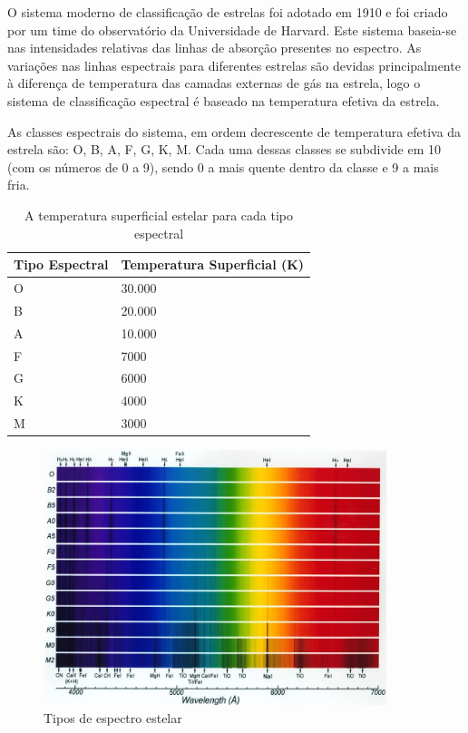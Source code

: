 O sistema moderno de classificação de estrelas foi adotado em 1910 e foi criado por um time do observatório da Universidade de Harvard. Este sistema baseia-se nas intensidades relativas das linhas de absorção presentes no espectro. As variações nas linhas espectrais para diferentes estrelas são devidas principalmente à diferença de temperatura das camadas externas de gás na estrela, logo o sistema de classificação espectral é baseado na temperatura efetiva da estrela. 

As classes espectrais do sistema, em ordem decrescente de temperatura efetiva da estrela são: O, B, A, F, G, K, M. Cada uma dessas classes se subdivide em 10 (com os números de 0 a 9), sendo 0 a mais quente dentro da classe e 9 a mais fria.

\begin{table}[htb]
\centering
\label{tab:stellar-temperatures}
\begin{tabular}{|l|l|}
\hline
\textbf{Tipo Espectral} & \textbf{Temperatura Superficial (K)} \\ \hline
O                       & 30.000                               \\ \hline
B                       & 20.000                               \\ \hline
A                       & 10.000                               \\ \hline
F                       & 7000                                 \\ \hline
G                       & 6000                                 \\ \hline
K                       & 4000                                 \\ \hline
M                       & 3000                                 \\ \hline
\end{tabular}
\caption{A temperatura superficial estelar para cada tipo espectral \citep{iag-stellar-temps}}
\end{table}

\begin{figure}[htb]
\centering
\includegraphics[width=10cm]{figuras/Spectra_Briley.jpg}
\caption{Tipos de espectro estelar \citep{astroprinceton}}
\label{fig:stellar-spectrum-types}
\end{figure}

